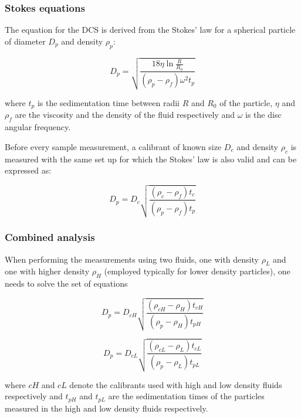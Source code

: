 \subsubsection{Stokes equations}
\label{sec:stokes}

The equation for the DCS is derived from the Stokes' law for a spherical particle of diameter $D_p$ and
density $\rho_p$:

\begin{equation}
D_p=\sqrt{\frac{18\eta\ln\frac{R}{R_0}}{\left( \rho_p - \rho_f \right)\omega^2 t_p}}
\label{eq:stokes}
\end{equation}

where $t_p$ is the sedimentation time between radii $R$ and $R_0$ of the particle, $\eta$ and $\rho_f$ are the viscosity and the density of the fluid respectively and $\omega$ is the disc angular frequency.

Before every sample measurement, a calibrant of known size $D_c$ and density $\rho_c$ is measured with the same set up for which the Stokes' law is also valid and can be expressed as:

\begin{equation}
D_p=D_c\sqrt{\frac{\left( \rho_c - \rho_f \right) t_c}{\left( \rho_p - \rho_f \right) t_p}}
\label{eq:software}
\end{equation}

\subsubsection{Combined analysis}
\label{sec:combined}
When performing the measurements using two fluids, one with density $\rho_L$ and one with higher
density $\rho_H$ (employed typically for lower density particles), one needs to solve the set of equations

\begin{equation}
D_p=D_{cH}\sqrt{\frac{\left( \rho_{cH} - \rho_H \right) t_{cH}}{\left( \rho_p - \rho_H \right) t_{pH}}}
\label{eq:sys1}
\end{equation}

\begin{equation}
D_p=D_{cL}\sqrt{\frac{\left( \rho_{cL} - \rho_L \right) t_{cL}}{\left( \rho_p - \rho_L \right) t_{pL}}}
\label{eq:sys2}
\end{equation}

where $cH$ and $cL$ denote the calibrants used with high and low density fluids respectively and $t_{pH}$
and $t_{pL}$ are the sedimentation times of the particles measured in the high and low density fluids
respectively. 

